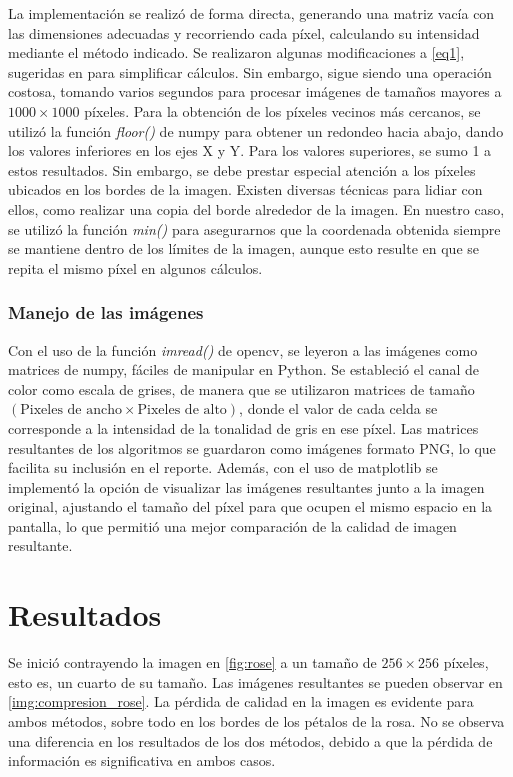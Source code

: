 \documentclass[12pt]{article}
\begin{document}
La implementación se realizó de forma directa, generando una matriz vacía con las dimensiones adecuadas y recorriendo cada píxel, calculando su intensidad mediante el método indicado. Se realizaron algunas modificaciones a \ref{eq1}, sugeridas en \cite{wojcickiBilinearInterpolation2022}
para simplificar cálculos. Sin embargo, sigue siendo una operación costosa, tomando varios segundos para procesar imágenes de tamaños mayores a $1000\times1000$ píxeles. Para la obtención de los píxeles vecinos más cercanos, se utilizó la función \textit{floor()} de numpy para obtener un redondeo hacia abajo, dando los valores inferiores en los ejes X y Y. Para los valores superiores, se sumo 1 a estos resultados. Sin embargo, se debe prestar especial atención a los píxeles ubicados en los bordes de la imagen. Existen diversas técnicas para lidiar con ellos, como realizar una copia del borde alrededor de la imagen. En nuestro caso, se utilizó la función \textit{min()} para asegurarnos que la coordenada obtenida siempre se mantiene dentro de los límites de la imagen, aunque esto resulte en que se repita el mismo píxel en algunos cálculos. 

\subsubsection{Manejo de las imágenes}
Con el uso de la función \textit{imread()} de opencv, se leyeron a las imágenes como matrices de numpy, fáciles de manipular en Python. Se estableció el canal de color como escala de grises, de manera que se utilizaron matrices de tamaño $(\text{Pixeles de ancho} \times \text{Pixeles de alto})$, donde el valor de cada celda se corresponde a la intensidad de la tonalidad de gris en ese píxel. Las matrices resultantes de los algoritmos se guardaron como imágenes formato PNG, lo que facilita su inclusión en el reporte. Además, con el uso de matplotlib se implementó la opción de visualizar las imágenes resultantes junto a la imagen original, ajustando el tamaño del píxel para que ocupen el mismo espacio en la pantalla, lo que permitió una mejor comparación de la calidad de imagen resultante. 

\section{Resultados}
Se inició contrayendo la imagen en \ref{fig:rose} a un tamaño de 
$256 \times 256$ píxeles, esto es, un cuarto de su tamaño. Las imágenes resultantes se pueden observar en \ref{img:compresion_rose}. La pérdida de calidad en la imagen es evidente para ambos métodos, sobre todo en los bordes de los pétalos de la rosa. No se observa una diferencia en los resultados de los dos métodos, debido a que la pérdida de información es significativa en ambos casos.
\end{document}
